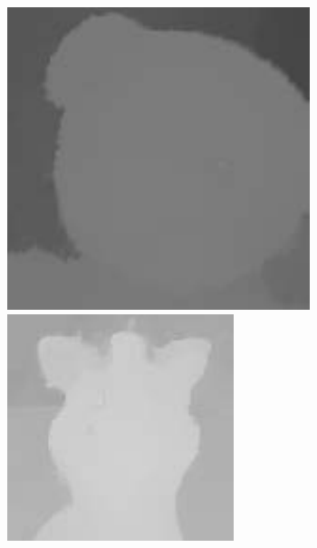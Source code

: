 \documentclass{bjtu-bachelor-thesis}
\begin{document}
\begin{figure}[!htbp]
\begin{minipage}[b]{\linewidth}
{\begin{minipage}[b]{0.085\linewidth}
      \includegraphics[width=\linewidth]{figures/doll/tgv_0.pdf}\vspace{2pt}
      \includegraphics[width=\linewidth]{figures/doll/tgv_1.pdf}

\end{minipage}}
\end{minipage}
\end{figure}
\end{document}
